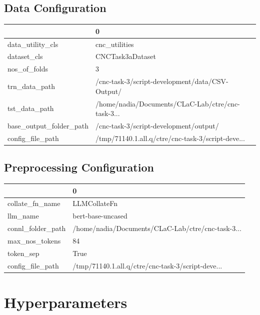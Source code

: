 \documentclass{article}
\begin{document}
\subsection{Data Configuration}
\begin{tabular}{ll}
\toprule
{} &                                                  0 \\
\midrule
data\_utility\_cls        &                                      cnc\_utilities \\
dataset\_cls             &                                   CNCTask3aDataset \\
nos\_of\_folds            &                                                  3 \\
trn\_data\_path           &    /cnc-task-3/script-development/data/CSV-Output/ \\
tst\_data\_path           &  /home/nadia/Documents/CLaC-Lab/ctre/cnc-task-3... \\
base\_output\_folder\_path &             /cnc-task-3/script-development/output/ \\
config\_file\_path        &  /tmp/71140.1.all.q/ctre/cnc-task-3/script-deve... \\
\bottomrule
\end{tabular}

\subsection{Preprocessing Configuration}
\begin{tabular}{ll}
\toprule
{} &                                                  0 \\
\midrule
collate\_fn\_name   &                                       LLMCollateFn \\
llm\_name          &                                  bert-base-uncased \\
connl\_folder\_path &  /home/nadia/Documents/CLaC-Lab/ctre/cnc-task-3... \\
max\_nos\_tokens    &                                                 84 \\
token\_sep         &                                               True \\
config\_file\_path  &  /tmp/71140.1.all.q/ctre/cnc-task-3/script-deve... \\
\bottomrule
\end{tabular}

\section{Hyperparameters}
\end{document}
